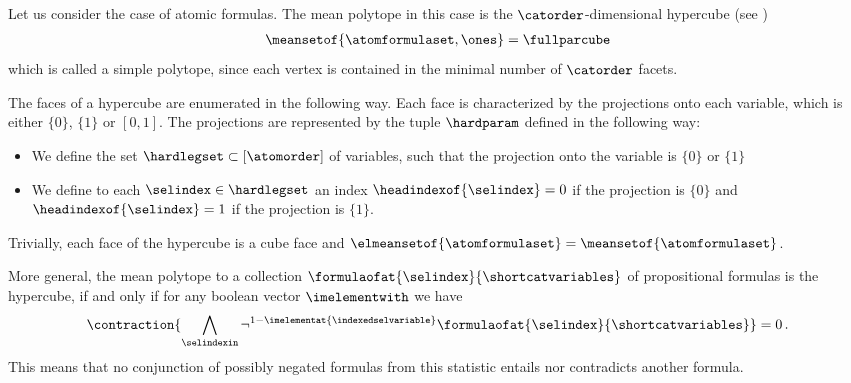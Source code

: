 \begin{example}
    \label{exa:atomicFormulasHypercube}
    Let us consider the case of atomic formulas. %
    The mean polytope in this case is the $\catorder$-dimensional hypercube (see )
    \begin{align*}
        \meansetof{\atomformulaset,\ones} = \fullparcube
    \end{align*}
    which is called a simple polytope, since each vertex is contained in the minimal number of $\catorder$ facets.

    The faces of a hypercube are enumerated in the following way.
    Each face is characterized by the projections onto each variable, which is either $\{0\}$, $\{1\}$ or $[0,1]$.
    The projections are represented by the tuple $\hardparam$ defined in the following way:
    \begin{itemize}
        \item We define the set $\hardlegset\subset[\atomorder]$ of variables, such that the projection onto the variable is $\{0\}$ or $\{1\}$
        \item We define to each $\selindex\in\hardlegset$ an index $\headindexof{\selindex}=0$ if the projection is $\{0\}$ and $\headindexof{\selindex}=1$ if the projection is $\{1\}$.
    \end{itemize}
    Trivially, each face of the hypercube is a cube face and $\elmeansetof{\atomformulaset}=\meansetof{\atomformulaset}$.

    More general, the mean polytope to a collection $\formulaofat{\selindex}{\shortcatvariables}$ of propositional formulas is the hypercube, if and only if for any boolean vector $\imelementwith$ we have
    \begin{align*}
        \contraction{\bigwedge_{\selindexin}\lnot^{1-\imelementat{\indexedselvariable}}\formulaofat{\selindex}{\shortcatvariables}} = 0 \, .
    \end{align*}
    This means that no conjunction of possibly negated formulas from this statistic entails nor contradicts another formula.

\end{example}